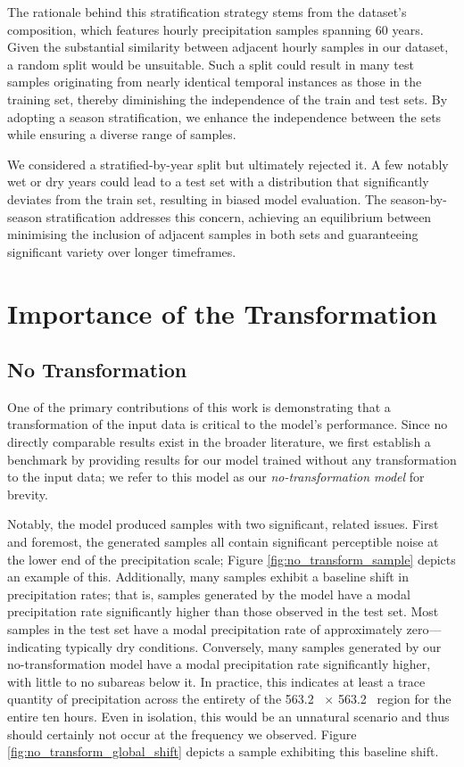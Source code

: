 \documentclass[ oneside,%
                    author={George Herbert},
                    degree={MSci},
                     title={Diffusion Models for Time-Evolving Precipitation Fields},
                  subtitle={}]{dissertation}
\begin{document}
The rationale behind this stratification strategy stems from the dataset's composition, which features hourly precipitation samples spanning 60 years. Given the substantial similarity between adjacent hourly samples in our dataset, a random split would be unsuitable. Such a split could result in many test samples originating from nearly identical temporal instances as those in the training set, thereby diminishing the independence of the train and test sets. By adopting a season stratification, we enhance the independence between the sets while ensuring a diverse range of samples.

We considered a stratified-by-year split but ultimately rejected it. A few notably wet or dry years could lead to a test set with a distribution that significantly deviates from the train set, resulting in biased model evaluation. The season-by-season stratification addresses this concern, achieving an equilibrium between minimising the inclusion of adjacent samples in both sets and guaranteeing significant variety over longer timeframes.

\section{Importance of the Transformation}
\label{sec:results_importance_of_transformation}

\subsection{No Transformation}
\label{sec:results_no_transformation}

One of the primary contributions of this work is demonstrating that a transformation of the input data is critical to the model's performance. Since no directly comparable results exist in the broader literature, we first establish a benchmark by providing results for our model trained without any transformation to the input data; we refer to this model as our \textit{no-transformation model} for brevity.

Notably, the model produced samples with two significant, related issues. First and foremost, the generated samples all contain significant perceptible noise at the lower end of the precipitation scale; Figure \ref{fig:no_transform_sample} depicts an example of this. Additionally, many samples exhibit a baseline shift in precipitation rates; that is, samples generated by the model have a modal precipitation rate significantly higher than those observed in the test set. Most samples in the test set have a modal precipitation rate of approximately zero---indicating typically dry conditions. Conversely, many samples generated by our no-transformation model have a modal precipitation rate significantly higher, with little to no subareas below it. In practice, this indicates at least a trace quantity of precipitation across the entirety of the 563.2\  $\times$ 563.2\  region for the entire ten hours. Even in isolation, this would be an unnatural scenario and thus should certainly not occur at the frequency we observed. Figure \ref{fig:no_transform_global_shift} depicts a sample exhibiting this baseline shift.
\end{document}
